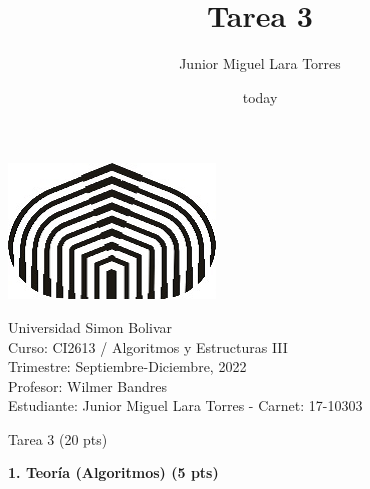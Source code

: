 \documentclass[a4paper,12pt]{article}
\title{Tarea 3}
\author{Junior Miguel Lara Torres}
\date{today}
\begin{document}
\begin{center}
\par \includegraphics[scale=1]{USB} \par
Universidad Simon Bolivar \\ Curso: CI2613 / Algoritmos y Estructuras III \\ Trimestre: Septiembre-Diciembre, 2022 \\ Profesor: Wilmer Bandres \\ Estudiante: Junior Miguel Lara Torres - Carnet: 17-10303 \\
\end{center}

\begin{center}
Tarea 3 (20 pts)
\end{center}

\textbf{1. Teoría (Algoritmos) (5 pts)}
\end{document}

